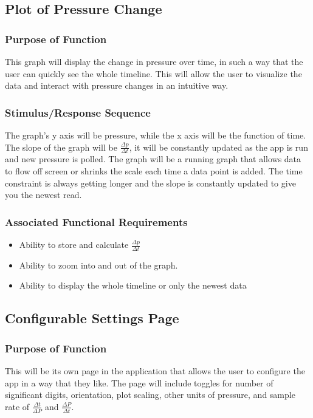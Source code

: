 \documentclass[onecolumn, draftclsnofoot,10pt, compsoc]{IEEEtran}
\begin{document}
\subsection{Plot of Pressure Change}
\subsubsection{Purpose of Function}
This graph will display the change in pressure over time, in such a way that the user can quickly see the whole timeline.
This will allow the user to visualize the data and interact with pressure changes in an intuitive way.
\subsubsection{Stimulus/Response Sequence}
The graph's y axis will be pressure, while the x axis will be the function of time.
The slope of the graph will be $\frac{\Delta p}{\Delta t}$, it will be constantly updated as the app is run and new pressure is polled.
The graph will be a running graph that allows data to flow off screen or shrinks the scale each time a data point is added.
The time constraint is always getting longer and the slope is constantly updated to give you the newest read.
\subsubsection{Associated Functional Requirements}
\begin{itemize}
\item Ability to store and calculate $\frac{\Delta p}{\Delta t}$
\item Ability to zoom into and out of the graph.
\item Ability to display the whole timeline or only the newest data
\end{itemize}

\subsection{Configurable Settings Page}
\subsubsection{Purpose of Function}
This will be its own page in the application that allows the user to configure the app in a way that they like.
The page will include toggles for number of significant digits, orientation, plot scaling, other units of pressure, and sample rate of $\frac{\Delta t}{\Delta P}$ and $\frac{\Delta P}{\Delta t}$.
\end{document}
